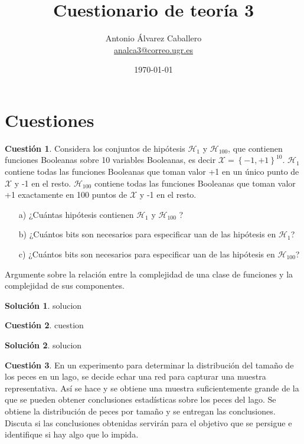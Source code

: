 \documentclass[a4paper, 11pt]{article}
\title{Cuestionario de teoría 3}
\author{Antonio Álvarez Caballero\\
    \href{mailto:analca3@correo.ugr.es}{analca3@correo.ugr.es}}
\date{\today}
\theoremstyle{definition}
\newtheorem{cuestion}{Cuestión}
\newtheorem*{solucion}{Solución}
\begin{document}
  \maketitle

  \section{Cuestiones}

  \begin{cuestion}
    Considera los conjuntos de hipótesis $\mathcal{H}_1$ y $\mathcal{H}_{100}$, que contienen funciones Booleanas sobre 10 variables Booleanas, es decir $\mathcal{X} = \left\{-1,+1 \right\}^{10}$. $\mathcal{H}_1$ contiene todas las funciones Booleanas que toman valor +1 en un único punto de $\mathcal{X}$ y -1 en el resto. $\mathcal{H}_{100}$ contiene todas las funciones Booleanas que toman valor +1 exactamente en 100 puntos de $\mathcal{X}$ y -1 en el resto.

    \begin{enumerate}
      \item[a)] ¿Cuántas hipótesis contienen $\mathcal{H}_1$ y $\mathcal{H}_{100}$ ?
      \item[b)] ¿Cuántos bits son necesarios para especificar uan de las hipótesis en $\mathcal{H}_1$?
      \item[c)] ¿Cuántos bits son necesarios para especificar uan de las hipótesis en $\mathcal{H}_{100}$?
    \end{enumerate}

    Argumente sobre la relación entre la complejidad de una clase de funciones y la complejidad de sus componentes.
  \end{cuestion}

  \begin{solucion}
    solucion
  \end{solucion}

  \begin{cuestion}
    cuestion
  \end{cuestion}

  \begin{solucion}
    solucion
  \end{solucion}

  \begin{cuestion}
    En un experimento para determinar la distribución del tamaño de los peces en un lago, se decide echar una red para capturar una muestra representativa. Así se hace y se obtiene una muestra suficientemente grande de la que se pueden obtener conclusiones estadísticas sobre los peces del lago. Se obtiene la distribución de peces por tamaño y se entregan las conclusiones. Discuta si las conclusiones obtenidas servirán para el objetivo que se persigue e identifique si hay algo que lo impida.
  \end{cuestion}
\end{document}
